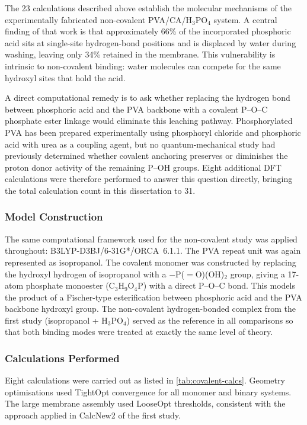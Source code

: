 \documentclass[12pt,a4paper]{report}
\begin{document}
The 23 calculations described above establish the molecular 
mechanisms of the experimentally fabricated non-covalent 
PVA/CA/H\(_3\)PO\(_4\) system. A central finding of that 
work is that approximately 66\% of the incorporated 
phosphoric acid sits at single-site hydrogen-bond positions 
and is displaced by water during washing, leaving only 34\% 
retained in the membrane. This vulnerability is intrinsic 
to non-covalent binding: water molecules can compete for 
the same hydroxyl sites that hold the acid.

A direct computational remedy is to ask whether replacing 
the hydrogen bond between phosphoric acid and the PVA 
backbone with a covalent P--O--C phosphate ester linkage 
would eliminate this leaching pathway. Phosphorylated PVA 
has been prepared experimentally using phosphoryl chloride 
and phosphoric acid with urea as a coupling agent, but no 
quantum-mechanical study had previously determined whether 
covalent anchoring preserves or diminishes the proton 
donor activity of the remaining P--OH groups. Eight 
additional DFT calculations were therefore performed to 
answer this question directly, bringing the total 
calculation count in this dissertation to 31.

\subsubsection{Model Construction}

The same computational framework used for the non-covalent 
study was applied throughout: B3LYP-D3BJ/6-31G*/ORCA~6.1.1. 
The PVA repeat unit was again represented as isopropanol. 
The covalent monomer was constructed by replacing the 
hydroxyl hydrogen of isopropanol with a 
$-$P($=$O)(OH)$_2$ group, giving a 17-atom phosphate 
monoester (C$_3$H$_9$O$_4$P) with a direct P--O--C bond. 
This models the product of a Fischer-type esterification 
between phosphoric acid and the PVA backbone hydroxyl 
group. The non-covalent hydrogen-bonded complex from the 
first study (isopropanol + H\(_3\)PO\(_4\)) served as the 
reference in all comparisons so that both binding modes 
were treated at exactly the same level of theory.

\subsubsection{Calculations Performed}

Eight calculations were carried out as listed in 
\ref{tab:covalent-calcs}. Geometry optimisations used TightOpt convergence 
for all monomer and binary systems. The large membrane 
assembly used LooseOpt thresholds, consistent with the 
approach applied in CalcNew2 of the first study.
\end{document}
